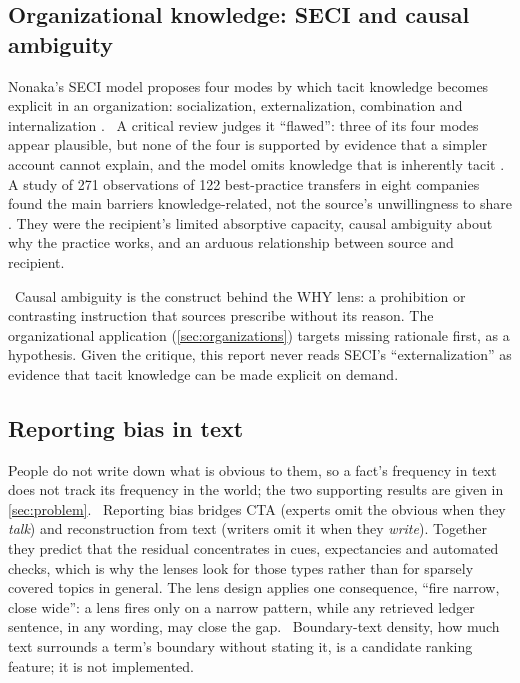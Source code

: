 \subsection{Organizational knowledge: SECI and causal ambiguity}

Nonaka's SECI model proposes four modes by which tacit knowledge becomes
explicit in an organization: socialization, externalization, combination and
internalization \parencite{nonaka1994dynamic}. \evlit\ A critical review
judges it ``flawed'': three of its four modes appear plausible, but none of
the four is supported by evidence that a simpler account cannot explain, and
the model omits knowledge that is inherently tacit
\parencite{gourlay2006conceptualizing}. A study of 271
observations of 122 best-practice transfers in eight companies found the main
barriers knowledge-related, not the source's unwillingness to share
\parencite{szulanski1996exploring}. They were the recipient's limited
absorptive capacity, causal ambiguity about why the practice works, and an
arduous relationship between source and recipient.

\evint\ Causal ambiguity is the construct behind the WHY lens: a prohibition
or contrasting instruction that sources prescribe without its reason. The
organizational application (\cref{sec:organizations}) targets missing
rationale first, as a hypothesis. Given the critique, this report never reads
SECI's ``externalization'' as evidence that tacit knowledge can be made
explicit on demand.

\subsection{Reporting bias in text}

People do not write down what is obvious to them, so a fact's frequency in
text does not track its frequency in the world; the two supporting results
\parencite{gordon2013reporting,paik2021world} are given in \cref{sec:problem}.
\evint\ Reporting bias bridges CTA (experts omit the obvious when they
\emph{talk}) and reconstruction from text (writers omit it when they
\emph{write}). Together they predict that the residual concentrates in cues,
expectancies and automated checks, which is why the lenses look for those
types rather than for sparsely covered topics in general. The lens design
applies one consequence, ``fire narrow, close wide'': a lens fires only on a
narrow pattern, while any retrieved ledger sentence, in any wording, may
close the gap. \evhyp\ Boundary-text density, how much text surrounds a
term's boundary without stating it, is a candidate ranking feature; it is
not implemented.

